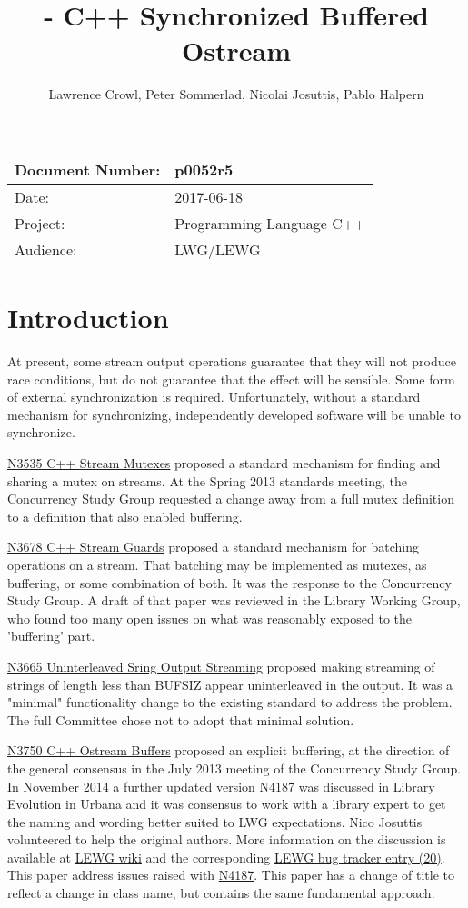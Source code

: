 \documentclass[ebook,11pt,article]{memoir}
\title{\papernumber{} - C++ Synchronized Buffered Ostream}
\author{Lawrence Crowl, Peter Sommerlad, Nicolai Josuttis, Pablo Halpern}
\date{\paperdate}                %
\newcommand{\papernumber}{p0052r5}
\newcommand{\paperdate}{2017-06-18}
\begin{document}
\maketitle
\begin{center}
\begin{tabular}[t]{|l|l|}\hline 
Document Number:&  \papernumber \\\hline
Date: & \paperdate \\\hline
Project: & Programming Language C++\\\hline 
Audience: & LWG/LEWG\\\hline
\end{tabular}
\end{center}
\chapter{Introduction}
At present, some stream output operations guarantee that they will not produce race conditions, but do not guarantee that the effect will be sensible. Some form of external synchronization is required. Unfortunately, without a standard mechanism for synchronizing, independently developed software will be unable to synchronize.

\href{https://wg21.link/n3535}{N3535 C++ Stream Mutexes} proposed a standard mechanism for finding and sharing a mutex on streams. At the Spring 2013 standards meeting, the Concurrency Study Group requested a change away from a full mutex definition to a definition that also enabled buffering.

\href{https://wg21.link/N3678}{N3678 C++ Stream Guards} proposed a standard mechanism for batching operations on a stream. That batching may be implemented as mutexes, as buffering, or some combination of both. It was the response to the Concurrency Study Group. A draft of that paper was reviewed in the Library Working Group, who found too many open issues on what was reasonably exposed to the 'buffering' part.

\href{https://wg21.link/N3665}{N3665 Uninterleaved Sring Output Streaming} proposed making streaming of strings of length less than BUFSIZ appear uninterleaved in the output. It was a "minimal" functionality change to the existing standard to address the problem. The full Committee chose not to adopt that minimal solution.

\href{https://wg21.link/N3750}{N3750 C++ Ostream Buffers} proposed an explicit buffering, at the direction of the general consensus in the July 2013 meeting of the Concurrency Study Group. In November 2014 a further updated version \href{https://wg21.link/N4187}{N4187} was discussed in Library Evolution in Urbana and it was consensus to work with a library expert to get the naming and wording better suited to LWG expectations. Nico Josuttis volunteered to help the original authors. More information on the discussion is available at \href{http://wiki.edg.com/twiki/bin/view/Wg21urbana-champaign/N4187}{LEWG wiki} and the corresponding \href{https://issues.isocpp.org/show_bug.cgi?id=20}{LEWG bug tracker entry (20)}. This paper address issues raised with \href{https://wg21.link/N4187}{N4187}. This paper has a change of title to reflect a change in class name, but contains the same fundamental approach.
\end{document}
